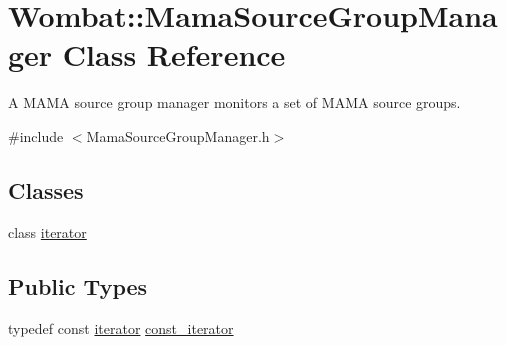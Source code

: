 \hypertarget{classWombat_1_1MamaSourceGroupManager}{
\section{Wombat::MamaSourceGroupManager Class Reference}
\label{classWombat_1_1MamaSourceGroupManager}
}


A MAMA source group manager monitors a set of MAMA source groups.  


{\ttfamily \#include $<$MamaSourceGroupManager.h$>$}\subsection*{Classes}
\begin{DoxyCompactItemize}
\item 
class \hyperlink{classWombat_1_1MamaSourceGroupManager_1_1iterator}{iterator}
\end{DoxyCompactItemize}
\subsection*{Public Types}
\begin{DoxyCompactItemize}
\item 
typedef const \hyperlink{classWombat_1_1MamaSourceGroupManager_1_1iterator}{iterator} \hyperlink{classWombat_1_1MamaSourceGroupManager_afa14fa7a340c9d5a934cd13ff0de44db}{const\_\-iterator}
\end{DoxyCompactItemize}
